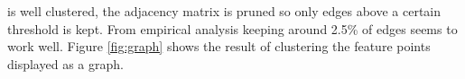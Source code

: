 \documentclass[12pt,journal,compsoc]{IEEEtran}
\begin{document}
is well clustered, the adjacency matrix is pruned so only edges above a 
certain threshold is kept. From empirical analysis keeping around 2.5\% 
of edges seems to work well. Figure \ref{fig:graph} shows the result of 
clustering the feature points displayed as a graph.
%
\begin{figure}
\end{figure}
\end{document}

